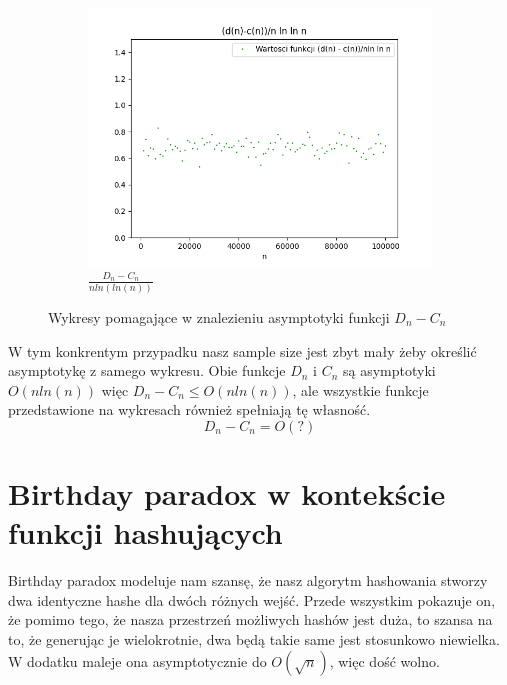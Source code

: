\documentclass{report}
\begin{document}
\begin{figure}[H]
\begin{subfigure}{.5\textwidth}
            \centering
            \includegraphics[width=1.2\linewidth]{plotdn-cnfunc3.png}
            \caption{\( \frac{D_n-C_n}{nln(ln(n))} \)}
            \label{fig:plotdncnfunc3}
          \end{subfigure}
        \caption{Wykresy pomagające w znalezieniu asymptotyki funkcji \(D_n-C_n\)}
        \label{fig:dncn}
    \end{figure}
\justifying
W tym konkrentym przypadku nasz sample size jest zbyt mały żeby określić asymptotykę
z samego wykresu. Obie funkcje \(D_n\) i \(C_n\) są asymptotyki \(O(nln(n))\) więc
\(D_n-C_n\leq O(nln(n))\), ale wszystkie funkcje przedstawione na wykresach również 
spełniają tę własność.
\[D_n-C_n=O(?)\]

\section*{Birthday paradox w kontekście funkcji hashujących}
\label{birthdayparadox}
Birthday paradox modeluje nam szansę, że nasz algorytm hashowania
stworzy dwa identyczne hashe dla dwóch różnych wejść. Przede wszystkim pokazuje on,
że pomimo tego, że nasza przestrzeń możliwych hashów jest duża, to szansa na to, że
generując je wielokrotnie, dwa będą takie same jest stosunkowo niewielka. W dodatku
maleje ona asymptotycznie do \(O(\sqrt{n})\), więc dość wolno.
\end{document}
